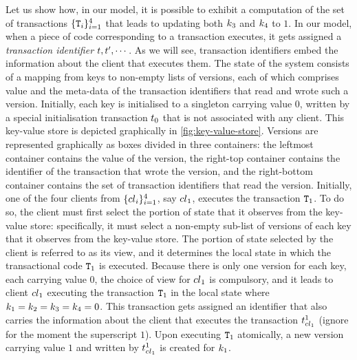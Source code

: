Let us show how, in our model, it is possible to exhibit a computation of 
the set of transactions $\{\mathtt{T}_{i}\}_{i=1}^{4}$ that leads to updating 
both $k_3$ and $k_4$ to $1$.
In our model, when a piece of code corresponding to a transaction executes, 
it gets assigned a \emph{transaction identifier} $\txid, \txid',\cdots$. 
As we will see, transaction identifiers 
embed the information about the client that executes them. 
The state of the system consists of a mapping from keys to non-empty lists of versions, each 
of which comprises value and the meta-data of the transaction identifiers 
that read and wrote such a version. Initially, each key is initialised to a singleton carrying 
value $0$, written by a special initialisation transaction $\txid_0$ that is not associated 
with any client. This key-value store is depicted graphically in \cref{fig:key-value-store}. Versions are represented graphically
as boxes divided in three containers: the leftmost container contains the value of the version, 
the right-top container contains the identifier of the transaction that wrote the version, 
and the right-bottom container contains the set of transaction identifiers that read the version. 
Initially, one of the four clients from $\{{cl}_{i}\}_{i=1}^{4}$, say 
${cl}_1$, executes the transaction $\mathtt{T}_1$. To do so, the client 
must first select the portion of state that it observes from the key-value store: 
specifically, it must select a non-empty sub-list of versions of each key that it observes from 
the key-value store. The portion of state selected by the client is referred to as its view, 
and it determines the local state in which the transactional code $\mathtt{T}_1$ is executed.
Because there is only one version for each key, each carrying value $0$, 
the choice of view for ${cl}_1$ is compulsory, 
and it leads to client ${cl}_1$ executing the transaction $\mathtt{T}_1$ in the local state 
where $k_1 = k_2 = k_3 = k_4 = 0$. This transaction gets assigned an identifier 
that also carries the information about the client that executes the transaction $\txid_{\cl_{1}}^{1}$ 
(ignore for the moment the superscript $1$). Upon executing $\mathtt{T}_1$ 
atomically, a new version carrying value $1$ and written by $\txid_{\cl_{1}}^{1}$ 
is created for $k_1$. 

